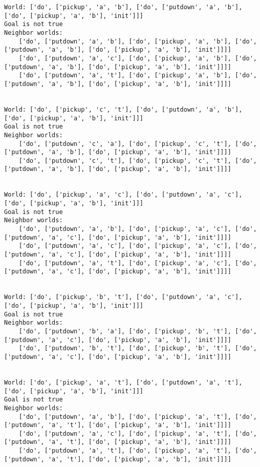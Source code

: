 \documentclass[11pt]{article}
\begin{document}
\begin{Verbatim}[commandchars=\\\{\}]
World: ['do', ['pickup', 'a', 'b'], ['do', ['putdown', 'a', 'b'], ['do', ['pickup', 'a', 'b'], 'init']]]
Goal is not true
Neighbor worlds:
    ['do', ['putdown', 'a', 'b'], ['do', ['pickup', 'a', 'b'], ['do', ['putdown', 'a', 'b'], ['do', ['pickup', 'a', 'b'], 'init']]]]
    ['do', ['putdown', 'a', 'c'], ['do', ['pickup', 'a', 'b'], ['do', ['putdown', 'a', 'b'], ['do', ['pickup', 'a', 'b'], 'init']]]]
    ['do', ['putdown', 'a', 't'], ['do', ['pickup', 'a', 'b'], ['do', ['putdown', 'a', 'b'], ['do', ['pickup', 'a', 'b'], 'init']]]]


World: ['do', ['pickup', 'c', 't'], ['do', ['putdown', 'a', 'b'], ['do', ['pickup', 'a', 'b'], 'init']]]
Goal is not true
Neighbor worlds:
    ['do', ['putdown', 'c', 'a'], ['do', ['pickup', 'c', 't'], ['do', ['putdown', 'a', 'b'], ['do', ['pickup', 'a', 'b'], 'init']]]]
    ['do', ['putdown', 'c', 't'], ['do', ['pickup', 'c', 't'], ['do', ['putdown', 'a', 'b'], ['do', ['pickup', 'a', 'b'], 'init']]]]


World: ['do', ['pickup', 'a', 'c'], ['do', ['putdown', 'a', 'c'], ['do', ['pickup', 'a', 'b'], 'init']]]
Goal is not true
Neighbor worlds:
    ['do', ['putdown', 'a', 'b'], ['do', ['pickup', 'a', 'c'], ['do', ['putdown', 'a', 'c'], ['do', ['pickup', 'a', 'b'], 'init']]]]
    ['do', ['putdown', 'a', 'c'], ['do', ['pickup', 'a', 'c'], ['do', ['putdown', 'a', 'c'], ['do', ['pickup', 'a', 'b'], 'init']]]]
    ['do', ['putdown', 'a', 't'], ['do', ['pickup', 'a', 'c'], ['do', ['putdown', 'a', 'c'], ['do', ['pickup', 'a', 'b'], 'init']]]]


World: ['do', ['pickup', 'b', 't'], ['do', ['putdown', 'a', 'c'], ['do', ['pickup', 'a', 'b'], 'init']]]
Goal is not true
Neighbor worlds:
    ['do', ['putdown', 'b', 'a'], ['do', ['pickup', 'b', 't'], ['do', ['putdown', 'a', 'c'], ['do', ['pickup', 'a', 'b'], 'init']]]]
    ['do', ['putdown', 'b', 't'], ['do', ['pickup', 'b', 't'], ['do', ['putdown', 'a', 'c'], ['do', ['pickup', 'a', 'b'], 'init']]]]


World: ['do', ['pickup', 'a', 't'], ['do', ['putdown', 'a', 't'], ['do', ['pickup', 'a', 'b'], 'init']]]
Goal is not true
Neighbor worlds:
    ['do', ['putdown', 'a', 'b'], ['do', ['pickup', 'a', 't'], ['do', ['putdown', 'a', 't'], ['do', ['pickup', 'a', 'b'], 'init']]]]
    ['do', ['putdown', 'a', 'c'], ['do', ['pickup', 'a', 't'], ['do', ['putdown', 'a', 't'], ['do', ['pickup', 'a', 'b'], 'init']]]]
    ['do', ['putdown', 'a', 't'], ['do', ['pickup', 'a', 't'], ['do', ['putdown', 'a', 't'], ['do', ['pickup', 'a', 'b'], 'init']]]]



\end{Verbatim}
\end{document}
